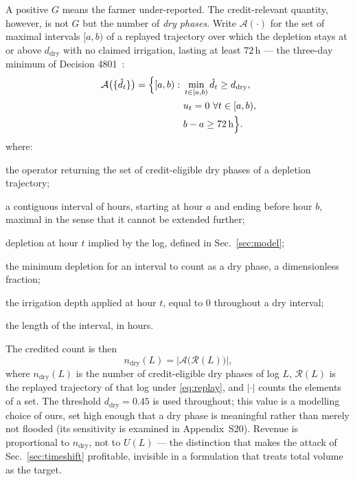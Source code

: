 A positive $G$ means the farmer under-reported. The credit-relevant quantity, however,
is not $G$ but the number of \emph{dry phases}. Write $\mathcal{A}(\cdot)$ for the set of maximal intervals
$[a,b)$ of a replayed
trajectory over which the depletion stays at or above $d_{\mathrm{dry}}$ with
no claimed irrigation, lasting at least $72$\,h --- the three-day minimum of
Decision 4801~\cite{qd4801}:
\begin{equation}
\begin{aligned}
\mathcal{A}\bigl(\{\hat d_t\}\bigr)=\Bigl\{[a,b):\ &\min_{t\in[a,b)}
\hat d_t\ge d_{\mathrm{dry}},\\
&u_t=0\ \forall t\in[a,b),\\
&b-a\ge 72\,\mathrm{h}\Bigr\}.
\end{aligned}
\label{eq:awd}
\end{equation}
where:
\begin{symbolist}
\item[$\mathcal{A}(\cdot)$] the operator returning the set of credit-eligible dry
  phases of a depletion trajectory;
\item[$[a,b)$] a contiguous interval of hours, starting at hour $a$ and ending before
  hour $b$, maximal in the sense that it cannot be extended further;
\item[$\hat d_t$] depletion at hour $t$ implied by the log, defined in
  Sec.~\ref{sec:model};
\item[$d_{\mathrm{dry}}$] the minimum depletion for an interval to count as a dry
  phase, a dimensionless fraction;
\item[$u_t$] the irrigation depth applied at hour $t$, equal to $0$ throughout a dry
  interval;
\item[$b-a$] the length of the interval, in hours.
\end{symbolist}

The credited count is then
\begin{equation}
n_{\mathrm{dry}}(L)=\bigl|\mathcal{A}\bigl(\mathcal{R}(L)\bigr)\bigr|,
\label{eq:ndry}
\end{equation}
where $n_{\mathrm{dry}}(L)$ is the number of credit-eligible dry phases of log $L$,
$\mathcal{R}(L)$ is the replayed trajectory of that log under \eqref{eq:replay}, and
$|\cdot|$ counts the elements of a set. The threshold $d_{\mathrm{dry}}=0.45$ is used
throughout; this value is a modelling choice of ours,
set high enough that a dry phase is meaningful rather than merely not flooded (its
sensitivity is examined in Appendix~S20). Revenue is proportional to
$n_{\mathrm{dry}}$, not to $U(L)$ --- the distinction that makes the attack of
Sec.~\ref{sec:timeshift} profitable, invisible in a formulation that treats
total volume as the target.

